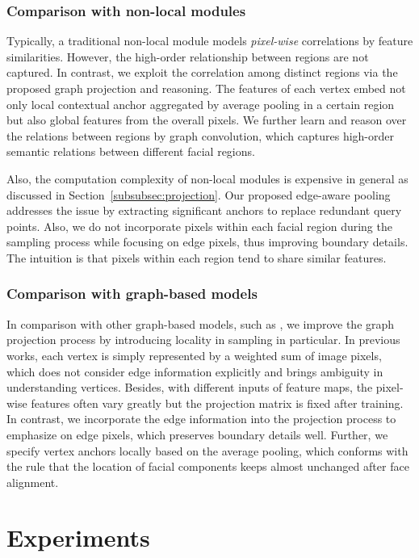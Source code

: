 \documentclass[runningheads]{llncs}
\begin{document}
\subsubsection{Comparison with non-local modules}
Typically, a traditional non-local module models {\it pixel-wise} correlations by feature similarities.  
However, the high-order relationship between regions are not captured. 
In contrast, we exploit the correlation among distinct regions via the proposed graph projection and reasoning. 
The features of each vertex embed not only local contextual anchor aggregated by average pooling in a certain region but also global features from the overall pixels. 
We further learn and reason over the relations between regions by graph convolution, which captures high-order semantic relations between different facial regions.  

Also, the computation complexity of non-local modules is expensive in general as discussed in Section~\ref{subsubsec:projection}.  
Our proposed edge-aware pooling addresses the issue by extracting significant anchors to replace redundant query points. 
Also, we do not incorporate pixels within each facial region during the sampling process while focusing on edge pixels, thus improving boundary details. 
The intuition is that pixels within each region tend to share similar features. 




\subsubsection{Comparison with graph-based models}
In comparison with other graph-based models, such as \cite{chen2019graph,li2018beyond}, we improve the graph projection process by introducing locality in sampling in particular. 
In previous works, each vertex is simply represented by a weighted sum of image pixels, which does not consider edge information explicitly and brings ambiguity in understanding vertices. 
Besides, with different inputs of feature maps, the pixel-wise features often vary greatly but the projection matrix is fixed after training. 
In contrast, we incorporate the edge information into the projection process to emphasize on edge pixels, which preserves boundary details well. 
Further, we specify vertex anchors locally based on the average pooling, which conforms with the rule that the location of facial components keeps almost unchanged after face alignment. 


\section{Experiments}
\end{document}
